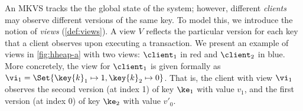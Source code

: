 


An MKVS tracks the the global state of the system; however, different \emph{clients} may observe different versions of the same key. 
To model this, we introduce the notion of \emph{views} (\cref{def:views}). 
A view $V$ reflects the particular version for each key that a client observes upon executing a transaction. 
We present an example of views in \cref{fig:hheap-a} with two views: $\client_1$ in red and $\client_2$ in blue.
More concretely, the view for \( \client_1 \) is given formally as $\vi_1 = \Set{\key{k}_1 \mapsto 1, \key{k}_2 \mapsto 0}$.
That is, the client with view $\vi_1$ observes the second version (at index 1) of key \( \ke_{1} \) with value $v_1$, and the first version (at index 0) of key \( \ke_2 \) with value $v'_0$.


